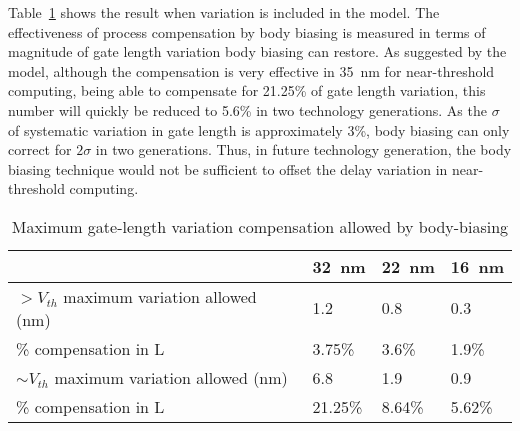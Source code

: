 Table~\ref{tbl:compensation} shows the result when variation is included in the model.
The effectiveness of process compensation by body biasing is measured in terms of magnitude of gate length variation body biasing can restore.
As suggested by the model, although the compensation is very effective in \SI{35}{\nano\meter} for near-threshold computing, being able to compensate for 21.25\% of gate length variation, this number will quickly be reduced to 5.6\% in two technology generations.
As the $\sigma$ of systematic variation in gate length is approximately 3\%, body biasing can only correct for $2\sigma$ in two generations.
Thus, in future technology generation, the body biasing technique would not be sufficient to offset the delay variation in near-threshold computing.

\begin{table}
  \caption {Maximum gate-length variation compensation allowed by body-biasing}  
  \centering
  \label {tbl:compensation}
  \begin{tabular}{ | l | l | l | l | }
    \hline
    & \SI{32}{\nano\meter} & \SI{22}{\nano\meter} & \SI{16}{\nano\meter} \\ \hline
    $>V_{th}$ maximum variation allowed (nm) & 1.2 & 0.8 & 0.3 \\ \hline
    \% compensation in L  & 3.75\% & 3.6\% & 1.9\% \\ \hline
    $\sim V_{th}$ maximum variation allowed (nm)  & 6.8 & 1.9 & 0.9\\  \hline
    \% compensation in L & 21.25\% & 8.64\% & 5.62\% \\ 
    \hline
  \end{tabular}
\end{table}
